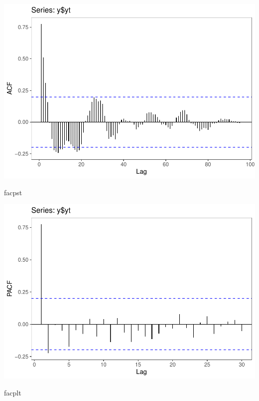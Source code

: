\documentclass[]{article}
\newenvironment{Shaded}{\begin{snugshade}}{\end{snugshade}}
\newcommand{\NormalTok}[1]{#1}
\begin{document}
\includegraphics{Econo2_P5_files/figure-latex/plots fac facp-2.pdf}

\begin{Shaded}
\begin{Highlighting}[]
\NormalTok{facpst}
\end{Highlighting}
\end{Shaded}

\includegraphics{Econo2_P5_files/figure-latex/plots fac facp-3.pdf}

\begin{Shaded}
\begin{Highlighting}[]
\NormalTok{facplt}
\end{Highlighting}
\end{Shaded}
\end{document}
